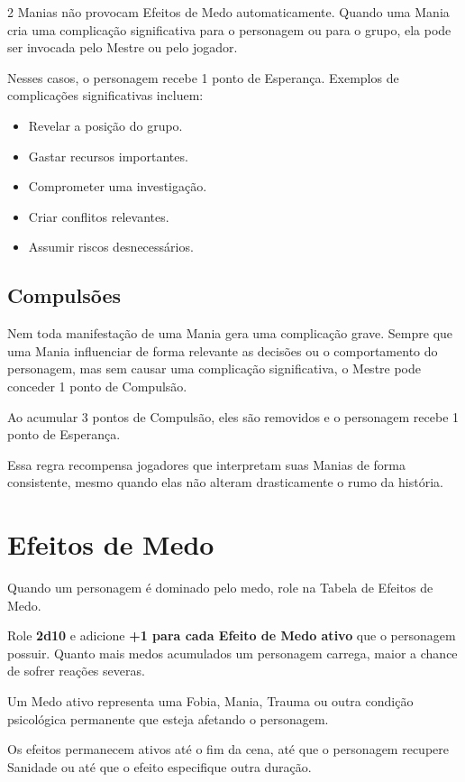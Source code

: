 \documentclass[a4paper,11pt,openany]{book}
\begin{document}
\begin{multicols}{2}
Manias não provocam Efeitos de Medo automaticamente. Quando uma Mania cria uma complicação significativa para o personagem ou para o grupo, ela pode ser invocada pelo Mestre ou pelo jogador.

Nesses casos, o personagem recebe 1 ponto de Esperança. Exemplos de complicações significativas incluem:
\begin{itemize}
\item Revelar a posição do grupo.
\item Gastar recursos importantes.
\item Comprometer uma investigação.
\item Criar conflitos relevantes.
\item Assumir riscos desnecessários.
\end{itemize}

\subsection{Compulsões}

Nem toda manifestação de uma Mania gera uma complicação grave. Sempre que uma Mania influenciar de forma relevante as decisões ou o comportamento do personagem, mas sem causar uma complicação significativa, o Mestre pode conceder 1 ponto de Compulsão.

Ao acumular 3 pontos de Compulsão, eles são removidos e o personagem recebe 1 ponto de Esperança.

Essa regra recompensa jogadores que interpretam suas Manias de forma consistente, mesmo quando elas não alteram drasticamente o rumo da história.

\section{Efeitos de Medo}

Quando um personagem é dominado pelo medo, role na Tabela de Efeitos de Medo.

Role \textbf{2d10} e adicione \textbf{+1 para cada Efeito de Medo ativo} que o personagem possuir. Quanto mais medos acumulados um personagem carrega, maior a chance de sofrer reações severas.

\begin{regra}
Um Medo ativo representa uma Fobia, Mania, Trauma ou outra condição psicológica permanente que esteja afetando o personagem.

Os efeitos permanecem ativos até o fim da cena, até que o personagem recupere Sanidade ou até que o efeito especifique outra duração.
\end{regra}


\end{multicols}
\end{document}
